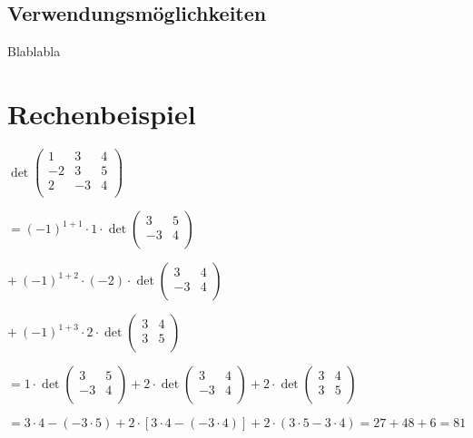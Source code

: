 \documentclass[11pt,a4paper]{article}
\begin{document}
\subsection{Verwendungsmöglichkeiten}
Blablabla

\section{Rechenbeispiel}
$
\det
\left(
	\begin{array}{rrr}
	1 & 3 & 4\\
	-2 & 3 & 5\\
	2 & -3 & 4\\
	\end{array}
\right)
$

$
= (-1)^{1+1} \cdot 1 \cdot \det 
\left(
	\begin{array}{rr}
	3 & 5\\
	-3 & 4\\
	\end{array}
\right)
$

$
+ ~(-1)^{1+2} \cdot (-2) \cdot \det 
\left(
\begin{array}{rr}
3 & 4\\
-3 & 4\\
\end{array}
\right)
$

$
+ ~(-1)^{1+3} \cdot 2 \cdot \det
\left(
\begin{array}{rr}
3 & 4\\
3 & 5\\
\end{array}
\right)
$

$
= 1 \cdot \det 
\left(
\begin{array}{rr}
	3 & 5\\
	-3 & 4\\
\end{array}
\right)
+ 2 \cdot \det 
\left(
\begin{array}{rr}
3 & 4\\
-3 & 4\\
\end{array}
\right)
+ 2 \cdot \det 
\left(
\begin{array}{rr}
3 & 4\\
3 & 5\\
\end{array}
\right)
$

$
= 3\cdot4 - (-3\cdot5) + 2\cdot[3\cdot4 - (-3\cdot4)] + 2\cdot(3\cdot5-3\cdot4) 
= 27 + 48 + 6
= 81$
\end{document}

